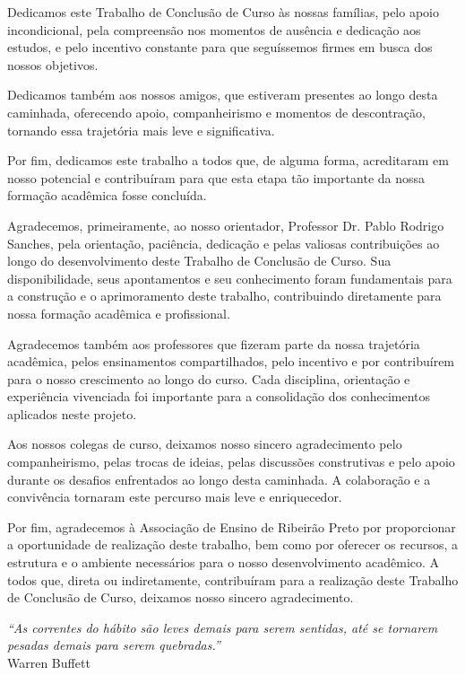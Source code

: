 \newpage
\vspace*{\fill}
\begin{flushright}
    \parbox{8cm}{
        \raggedright
        \setlength{\parskip}{6pt}
        Dedicamos este Trabalho de Conclusão de Curso às nossas famílias, pelo apoio incondicional, pela compreensão nos momentos de ausência e dedicação aos estudos, e pelo incentivo constante para que seguíssemos firmes em busca dos nossos objetivos.

        Dedicamos também aos nossos amigos, que estiveram presentes ao longo desta caminhada, oferecendo apoio, companheirismo e momentos de descontração, tornando essa trajetória mais leve e significativa.

        Por fim, dedicamos este trabalho a todos que, de alguma forma, acreditaram em nosso potencial e contribuíram para que esta etapa tão importante da nossa formação acadêmica fosse concluída.
    }
\end{flushright}

\newpage
{}

Agradecemos, primeiramente, ao nosso orientador, Professor Dr. Pablo Rodrigo Sanches, pela orientação, paciência, dedicação e pelas valiosas contribuições ao longo do desenvolvimento deste Trabalho de Conclusão de Curso. Sua disponibilidade, seus apontamentos e seu conhecimento foram fundamentais para a construção e o aprimoramento deste trabalho, contribuindo diretamente para nossa formação acadêmica e profissional.

Agradecemos também aos professores que fizeram parte da nossa trajetória acadêmica, pelos ensinamentos compartilhados, pelo incentivo e por contribuírem para o nosso crescimento ao longo do curso. Cada disciplina, orientação e experiência vivenciada foi importante para a consolidação dos conhecimentos aplicados neste projeto.

Aos nossos colegas de curso, deixamos nosso sincero agradecimento pelo companheirismo, pelas trocas de ideias, pelas discussões construtivas e pelo apoio durante os desafios enfrentados ao longo desta caminhada. A colaboração e a convivência tornaram este percurso mais leve e enriquecedor.

Por fim, agradecemos à Associação de Ensino de Ribeirão Preto por proporcionar a oportunidade de realização deste trabalho, bem como por oferecer os recursos, a estrutura e o ambiente necessários para o nosso desenvolvimento acadêmico. A todos que, direta ou indiretamente, contribuíram para a realização deste Trabalho de Conclusão de Curso, deixamos nosso sincero agradecimento.

\newpage
\vspace*{\fill}
\begin{flushright}
    \parbox{8cm}{
        \textit{``As correntes do hábito são leves demais para serem sentidas, até se tornarem pesadas demais para serem quebradas.''}\\[6pt]
        Warren Buffett
    }
\end{flushright}
